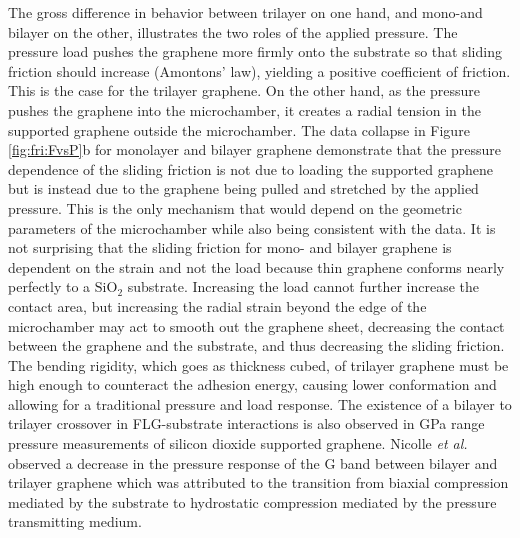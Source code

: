 The gross difference in behavior between trilayer on one hand, and mono-and bilayer on the other, illustrates the two roles of the applied pressure.
The pressure load pushes the graphene more firmly onto the substrate so that sliding friction should increase (Amontons' law), yielding a positive coefficient of friction.
This is the case for the trilayer graphene.
On the other hand, as the pressure pushes the graphene into the microchamber, it creates a radial tension in the supported graphene outside the microchamber.
The data collapse in Figure \ref{fig:fri:FvsP}b for monolayer and bilayer graphene demonstrate that the pressure dependence of the sliding friction is not due to loading the supported graphene but is instead due to the graphene being pulled and stretched by the applied pressure.
This is the only mechanism that would depend on the geometric parameters of the microchamber while also being consistent with the data.
It is not surprising that the sliding friction for mono- and bilayer graphene is dependent on the strain and not the load because thin graphene conforms nearly perfectly to a $\mathrm{SiO_2}$ substrate\cite{Stolyarova2007,Lui2009,Cullen2010}.
Increasing the load cannot further increase the contact area, but increasing the radial strain beyond the edge of the microchamber may act to smooth out the graphene sheet, decreasing the contact between the graphene and the substrate, and thus decreasing the sliding friction.
The bending rigidity, which goes as thickness cubed, of trilayer graphene must be high enough to counteract the adhesion energy, causing lower conformation and allowing for a traditional pressure and load response.
The existence of a bilayer to trilayer crossover in FLG-substrate interactions is also observed in GPa range pressure measurements of silicon dioxide supported graphene\cite{Proctor2009,Nicolle2011}.
Nicolle \emph{et al.} observed a decrease in the pressure response of the G band between bilayer and trilayer graphene which was attributed to the transition from biaxial compression mediated by the substrate to hydrostatic compression mediated by the pressure transmitting medium\cite{Nicolle2011}.

